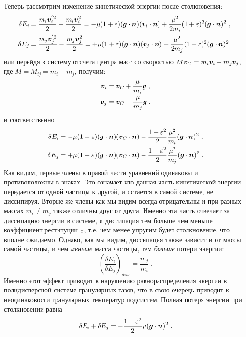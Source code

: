 Теперь рассмотрим изменение кинетической энергии после столкновения:
\begin{equation}\label{eq:delta_E_v}
  \begin{split}
    \delta E_i &= \frac{m_i\bm{v}^{'2}_i}{2}-\frac{m_i\bm{v}^2_i}{2} 
    = -\mu(1+\varepsilon)(\bm{g}\cdot\bm{n})(\bm{v}_i\cdot\bm{n})+\frac{\mu^2}{2m_i}(1+\varepsilon)^2(\bm{g}\cdot\bm{n})^2\;, \\
    \delta E_j &= \frac{m_j\bm{v}^{'2}_j}{2}-\frac{m_j\bm{v}^2_j}{2} 
    = +\mu(1+\varepsilon)(\bm{g}\cdot\bm{n})(\bm{v}_j\cdot\bm{n})+\frac{\mu^2}{2m_j}(1+\varepsilon)^2(\bm{g}\cdot\bm{n})^2\;, \\
  \end{split}
\end{equation}
или перейдя в систему отсчета центра масс со скоростью $M\bm{v}_C=m_i\bm{v}_i+m_j\bm{v}_j$, где $M=M_{ij}=m_i+m_j$, получим:
\begin{equation}
  \begin{split}
    \bm{v}_i &= \bm{v}_C + \frac{\mu}{m_i}\bm{g}\;,\\
    \bm{v}_j &= \bm{v}_C - \frac{\mu}{m_j}\bm{g}\;,
  \end{split}
\end{equation}
и соответственно
\begin{equation}\label{eq:delta_E}
  \begin{split}
    \delta E_i &= -\mu(1+\varepsilon)(\bm{g}\cdot\bm{n})(\bm{v}_C\cdot\bm{n})-\frac{1-\varepsilon^2}{2}\frac{\mu^2}{m_i}(\bm{g}\cdot\bm{n})^2\;,\\
    \delta E_j &= +\mu(1+\varepsilon)(\bm{g}\cdot\bm{n})(\bm{v}_C\cdot\bm{n})-\frac{1-\varepsilon^2}{2}\frac{\mu^2}{m_j}(\bm{g}\cdot\bm{n})^2\;.\\
  \end{split}
\end{equation}
Как видим, первые члены в правой части уравнений одинаковы и противоположны в знаках. Это означает что данная часть
кинетической энергии передается от одной частицы к другой, и остается в самой системе, не диссипируя. Вторые же
члены как мы видим всегда отрицательны и при разных массах $m_i\neq m_j$ также отличны друг от друга. Именно эта 
часть отвечает за диссипацию энергии в системе, и диссипация тем больше чем меньше коэффициент реституции $\varepsilon$,
т.е. чем менее упругим будет столкновение, что вполне ожидаемо. Однако, как мы видим, диссипация также зависит
и от массы самой частицы, и чем \emph{меньше} масса частицы, тем \emph{больше} потери энергии:
\begin{equation}
  \left(\frac{\delta E_i}{\delta E_j}\right)_{diss}=\frac{m_j}{m_i}\;.
\end{equation}
Именно этот эффект приводит к нарушению равнораспределения энергии в полидисперсной системе гранулярных газов,
что в свою очередь приводит к неодинаковости гранулярных температур подсистем.
Полная потеря энергии при столкновении равна
\begin{equation}
  \delta E_i+\delta E_j = -\frac{1-\varepsilon^2}{2}\mu(\bm{g}\cdot\bm{n})^2\;.
\end{equation}

